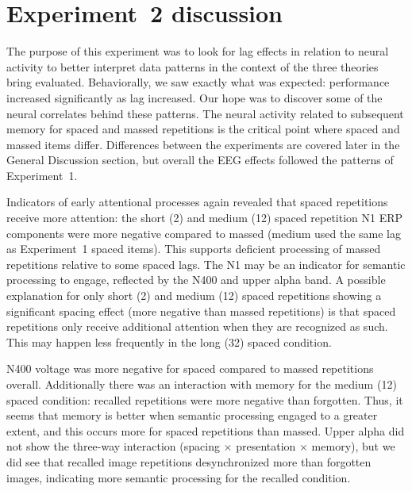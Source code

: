 

\section{Experiment~2 discussion}

The purpose of this experiment was to look for lag effects in relation to neural activity to better interpret data patterns in the context of the three theories bring evaluated.
Behaviorally, we saw exactly what was expected: performance increased significantly as lag increased.  Our hope was to discover some of the neural correlates behind these patterns. 
The neural activity related to subsequent memory for spaced and massed repetitions is the critical point where spaced and massed items differ.  Differences between the experiments are covered later in the General Discussion section, but overall the EEG effects followed the patterns of Experiment~1.


Indicators of early attentional processes again revealed that spaced repetitions receive more attention: the short (2) and medium (12) spaced repetition N1 ERP components were more negative compared to massed (medium used the same lag as Experiment~1 spaced items).  This supports deficient processing of massed repetitions relative to some spaced lags.  The N1 may be an indicator for semantic processing to engage, reflected by the N400 and upper alpha band.
\cbstart
A possible explanation for only short (2) and medium (12) spaced repetitions showing a significant spacing effect (more negative than massed repetitions) is that spaced repetitions only receive additional attention when they are recognized as such.  This may happen less frequently in the long (32) spaced condition.
\cbend

N400 voltage was more negative for spaced compared to massed repetitions overall.  Additionally there was an interaction with memory for the medium (12) spaced condition: recalled repetitions were more negative than forgotten.  Thus, it seems that memory is better when semantic processing engaged to a greater extent, and this occurs more for spaced repetitions than massed.  Upper alpha did not show the three-way interaction (spacing $\times$ presentation $\times$ memory), but we did see that recalled image repetitions desynchronized more than forgotten images, indicating more semantic processing for the recalled condition.

